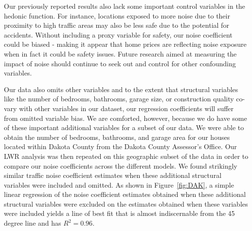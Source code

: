 \documentclass{article}\usepackage{graphicx, color}
\begin{document}
Our previously reported results also lack some important control variables in the hedonic function. For instance, locations exposed to more noise due to their proximity to high traffic areas may also be less safe due to the potential for accidents. Without including a proxy variable for safety, our noise coefficient could be biased - making it appear that home prices are reflecting noise exposure when in fact it could be safety issues. Future research aimed at measuring the impact of noise should continue to seek out and control for other confounding variables. 

Our data also omits other variables and to the extent that structural variables like the number of bedrooms, bathrooms, garage size, or construction quality co-vary with other variables in our dataset, our regression coefficients will suffer from omitted variable bias. We are comforted, however, because we do have some of these important additional variables for a subset of our data. We were able to obtain the number of bedrooms, bathrooms, and garage area for our houses located within Dakota County from the Dakota County Assessor's Office. Our LWR analysis was then repeated on this geographic subset of the data in order to compare our noise coefficients across the different models. We found strikingly similar traffic noise coefficient estimates when these additional structural variables were included and omitted. As shown in Figure~\ref{fig:DAK}, a simple linear regression of the noise coefficient estimates obtained when these additional structural variables were excluded on the estimates obtained when these variables were included yields a line of best fit that is almost indiscernable from the 45 degree line and has $R^2 = 0.96$. %
\end{document}
